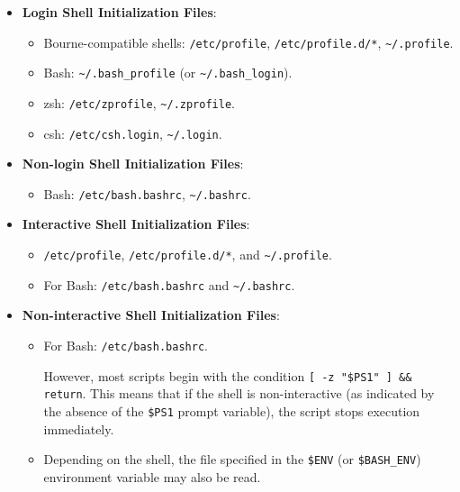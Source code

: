 \begin{itemize}
    \item \textbf{Login Shell Initialization Files}:
    \begin{itemize}
        \item Bourne-compatible shells: \texttt{/etc/profile}, \texttt{/etc/profile.d/*}, \texttt{\textasciitilde/.profile}.
        \item Bash: \texttt{\textasciitilde/.bash\_profile} (or \texttt{\textasciitilde/.bash\_login}).
        \item zsh: \texttt{/etc/zprofile}, \texttt{\textasciitilde/.zprofile}.
        \item csh: \texttt{/etc/csh.login}, \texttt{\textasciitilde/.login}.
    \end{itemize}

    \item \textbf{Non-login Shell Initialization Files}:
    \begin{itemize}
        \item Bash: \texttt{/etc/bash.bashrc}, \texttt{\textasciitilde/.bashrc}.
    \end{itemize}

    \item \textbf{Interactive Shell Initialization Files}:
    \begin{itemize}
        \item \texttt{/etc/profile}, \texttt{/etc/profile.d/*}, and \texttt{\textasciitilde/.profile}.
        \item For Bash: \texttt{/etc/bash.bashrc} and \texttt{\textasciitilde/.bashrc}.
    \end{itemize}

    \item \textbf{Non-interactive Shell Initialization Files}:
    \begin{itemize}
        \item For Bash: \texttt{/etc/bash.bashrc}. 
        
        However, most scripts begin with the condition \texttt{[ -z "\$PS1" ] \&\& return}.
        This means that if the shell is non-interactive (as indicated by the absence of the \texttt{\$PS1} prompt variable), the script stops execution immediately.
        
        \item Depending on the shell, the file specified in the \texttt{\$ENV} (or \texttt{\$BASH\_ENV}) environment variable may also be read.
    \end{itemize}
\end{itemize}

